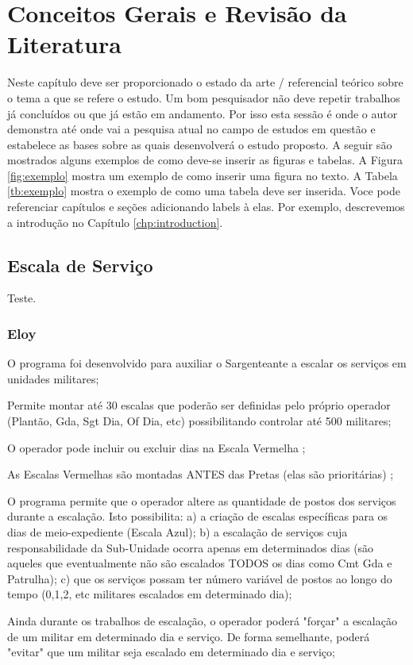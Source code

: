 \chapter{Conceitos Gerais e Revisão da Literatura}
Neste capítulo deve ser proporcionado o estado da arte / referencial teórico
sobre o tema a que se refere o estudo. Um bom pesquisador não deve repetir
trabalhos já concluídos ou que já estão em andamento. Por isso esta sessão é
onde o autor demonstra até onde vai a pesquisa atual no campo de estudos em
questão e estabelece as bases sobre as quais desenvolverá o estudo proposto. A
seguir são mostrados alguns exemplos de como deve-se inserir as figuras e
tabelas. A Figura \ref{fig:exemplo} mostra um exemplo de como inserir uma
figura no texto. A Tabela \ref{tb:exemplo} mostra o exemplo de como uma tabela
deve ser inserida.  Voce pode referenciar capítulos e seções adicionando labels
à elas. Por exemplo, descrevemos a introdução no Capítulo
\ref{chp:introduction}.

\section{Escala de Serviço}
Teste.

\subsection{Eloy}
O programa foi desenvolvido para auxiliar o Sargenteante a escalar os serviços em unidades militares;

Permite montar até 30 escalas que poderão ser definidas pelo próprio operador (Plantão, Gda, Sgt Dia, Of Dia, etc) possibilitando controlar até 500 militares;

O operador pode incluir ou excluir dias na Escala Vermelha ;

As Escalas Vermelhas são montadas ANTES das Pretas (elas são prioritárias) ;

O programa permite que o operador altere as quantidade de postos dos serviços durante a escalação. Isto possibilita: a) a criação de escalas específicas para os dias de meio-expediente (Escala Azul); b) a escalação de serviços cuja responsabilidade da Sub-Unidade ocorra apenas em determinados dias (são aqueles que eventualmente não são escalados TODOS os dias como Cmt Gda e Patrulha); c) que os serviços possam ter número variável de postos ao longo do tempo (0,1,2, etc militares escalados em determinado dia);

Ainda durante os trabalhos de escalação, o operador poderá "forçar" a escalação de um militar em determinado dia e serviço. De forma semelhante, poderá "evitar" que um militar seja escalado em determinado dia e serviço;

